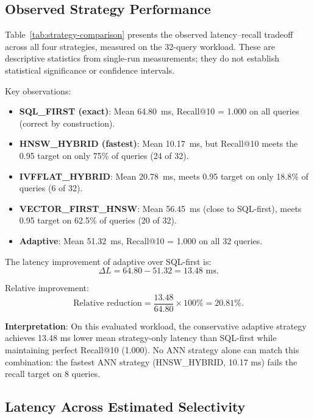 \documentclass[10pt,twocolumn]{article}
\begin{document}
\subsection{Observed Strategy Performance}

Table~\ref{tab:strategy-comparison} presents the observed latency--recall tradeoff across all four strategies, measured on the 32-query workload. These are descriptive statistics from single-run measurements; they do not establish statistical significance or confidence intervals.



Key observations:

\begin{itemize}
\item \textbf{SQL\_FIRST (exact)}: Mean 64.80~ms, Recall@10 = 1.000 on all queries (correct by construction).
\item \textbf{HNSW\_HYBRID (fastest)}: Mean 10.17~ms, but Recall@10 meets the 0.95 target on only 75\% of queries (24 of 32).
\item \textbf{IVFFLAT\_HYBRID}: Mean 20.78~ms, meets 0.95 target on only 18.8\% of queries (6 of 32).
\item \textbf{VECTOR\_FIRST\_HNSW}: Mean 56.45~ms (close to SQL-first), meets 0.95 target on 62.5\% of queries (20 of 32).
\item \textbf{Adaptive}: Mean 51.32~ms, Recall@10 = 1.000 on all 32 queries.
\end{itemize}

The latency improvement of adaptive over SQL-first is:
\begin{equation}
\Delta L = 64.80 - 51.32 = 13.48 \text{ ms}.
\end{equation}

Relative improvement:
\begin{equation}
\text{Relative reduction} = \frac{13.48}{64.80} \times 100\% = 20.81\%.
\end{equation}

\textbf{Interpretation}: On this evaluated workload, the conservative adaptive strategy achieves 13.48 ms lower mean strategy-only latency than SQL-first while maintaining perfect Recall@10 (1.000). No ANN strategy alone can match this combination: the fastest ANN strategy (HNSW\_HYBRID, 10.17 ms) fails the recall target on 8 queries.

\subsection{Latency Across Estimated Selectivity}
\end{document}
